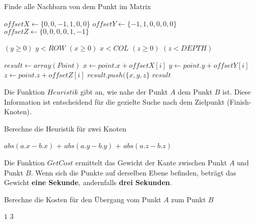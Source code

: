\documentclass[a4paper,10pt,ngerman]{scrartcl}
\begin{document}
\begin{algorithm}
    \caption{Finde alle Nachbarn von dem Punkt im Matrix}
    \begin{algorithmic}
        \State $offsetX \gets \{0, 0, -1, 1, 0 ,0\}$
        \State $offsetY \gets \{-1, 1, 0, 0, 0, 0\}$
        \State $offsetZ \gets \{0, 0, 0, 0, 1, -1\}$

        \State \Return $(y \geq 0)$ \AND $y < ROW$ \AND $(x \geq 0)$ \AND $x < COL$ \AND $(z \geq 0)$ \AND $(z < DEPTH)$
        \EndFunction
        
        \State $result \gets array(Point)$
        \State $x \gets point.x + offsetX[i]$
        \State $y \gets point.y + offsetY[i]$
        \State $z \gets point.z + offsetZ[i]$
        \State $result.push(\{x, y, z\}$
        \EndIf
        \EndFor
        \State \Return $result$
        \EndFunction
    \end{algorithmic}
\end{algorithm}
\vspace{0.5cm}

Die Funktion \textbf{$Heuristik$} gibt an, wie nahe der Punkt $A$ dem Punkt $B$ ist. Diese Information ist entscheidend für die gezielte Suche nach dem Zielpunkt (Finish-Knoten).

\begin{algorithm}
    \caption{Berechne die Heuristik für zwei Knoten}
    \begin{algorithmic}
        \State \Return $abs(a.x - b.x)$ + $abs(a.y - b.y)$ + $abs(a.z - b.z)$
        \EndFunction
    \end{algorithmic}
\end{algorithm}
\vspace{0.5cm}

Die Funktion \textbf{$GetCost$} ermittelt das Gewicht der Kante zwischen Punkt $A$ und Punkt $B$. Wenn sich die Punkte auf derselben Ebene befinden, beträgt das Gewicht \textbf{eine Sekunde}, andernfalls \textbf{drei Sekunden}.

\begin{algorithm}
    \caption{Berechne die Kosten für den Übergang vom Punkt $A$ zum Punkt $B$}
    \begin{algorithmic}
        \State \Return $1$
        \Else
        \State \Return $3$
        \EndIf
        \EndFunction
    \end{algorithmic}
\end{algorithm}
\end{document}
